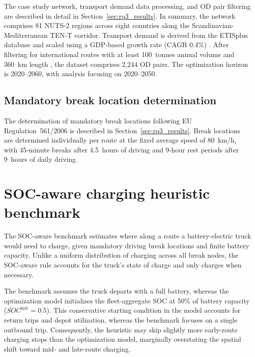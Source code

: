 The case study network, transport demand data processing, and OD pair filtering are described in detail in Section~\ref{sec:rq3_results}. In summary, the network comprises 81 NUTS-2 regions across eight countries along the Scandinavian-Mediterranean TEN-T corridor. Transport demand is derived from the ETISplus database \citep{Speth2021} and scaled using a GDP-based growth rate (CAGR 0.4\%) \citep{eurostat2024roadfreight}. After filtering for international routes with at least 100~tonnes annual volume and 360~km length \citep{SHOMAN2023103825}, the dataset comprises 2{,}244 OD pairs. The optimization horizon is 2020--2060, with analysis focusing on 2020--2050.

\subsection{Mandatory break location determination}

The determination of mandatory break locations following EU Regulation~561/2006 is described in Section~\ref{sec:rq3_results}. Break locations are determined individually per route at the fixed average speed of 80~km/h, with 45-minute breaks after 4.5~hours of driving and 9-hour rest periods after 9~hours of daily driving.


\section{SOC-aware charging heuristic benchmark}\label{app:rq3_soc_benchmark}

The SOC-aware benchmark estimates where along a route a battery-electric truck would need to charge, given mandatory driving break locations and finite battery capacity. Unlike a uniform distribution of charging across all break nodes, the SOC-aware rule accounts for the truck's state of charge and only charges when necessary.

The benchmark assumes the truck departs with a full battery, whereas the optimization model initializes the fleet-aggregate SOC at 50\% of battery capacity ($SOC^{\mathrm{init}} = 0.5$). This conservative starting condition in the model accounts for return trips and depot utilization, whereas the benchmark focuses on a single outbound trip. Consequently, the heuristic may skip slightly more early-route charging stops than the optimization model, marginally overstating the spatial shift toward mid- and late-route charging.

